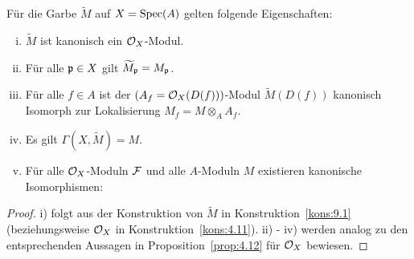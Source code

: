 \begin{prop}
\label{prop:9.2}
	Für die Garbe $\widetilde{M}$ auf $X=\operatorname{Spec}(A)$ gelten folgende Eigenschaften:
	\begin{enumerate}[i)]
		\item $\widetilde{M}$ ist kanonisch ein $\mathcal{O}_X$-Modul.
		\item Für alle $\mathfrak{p} \in X$ gilt $\widetilde{M}_{\mathfrak{p}} = M_{\mathfrak{p}}$.
		\item Für alle $f \in A$ ist der $(A_f = \mathcal{O}_X(D(f)))$-Modul $\widetilde{M}(D(f))$ kanonisch Isomorph zur Lokalisierung $M_f = M \otimes_A A_f$.
		\item Es gilt $\Gamma(X,\widetilde{M}) = M$.
		\item Für alle $\mathcal{O}_X$-Moduln $\mathcal{F}$ und alle $A$-Moduln $M$ existieren kanonische Isomorphismen:
		\begin{center}
		\end{center}
	\end{enumerate}
	\begin{proof}
		i) folgt aus der Konstruktion von $\widetilde{M}$ in Konstruktion~\ref{kons:9.1} (beziehungsweise $\mathcal{O}_X$ in Konstruktion~\ref{kons:4.11}). ii) - iv) werden analog zu den entsprechenden Aussagen in Proposition~\ref{prop:4.12} für $\mathcal{O}_X$ bewiesen.


\end{proof}
\end{prop}
